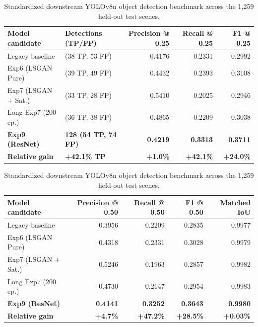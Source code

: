 \documentclass[10pt,a4paper,twoside]{article}
\begin{document}
\begin{table}[htbp]
    \caption{Standardized downstream YOLOv8n object detection benchmark across the 1,259 held-out test scenes.}
    \label{tab:yolo}
    \centering
    \scriptsize
    \setlength{\tabcolsep}{3pt}
    \begin{tabularx}{\textwidth}{@{}>{\raggedright\arraybackslash}X>{\centering\arraybackslash}p{2.1cm}rrr@{}}
        \toprule
        \textbf{Model candidate} & \textbf{Detections (TP/FP)} & \textbf{Precision @ 0.25} & \textbf{Recall @ 0.25} & \textbf{F1 @ 0.25} \\
        \midrule
        Legacy baseline & 91 (38 TP, 53 FP) & 0.4176 & 0.2331 & 0.2992 \\
        Exp6 (LSGAN Pure) & 88 (39 TP, 49 FP) & 0.4432 & 0.2393 & 0.3108 \\
        Exp7 (LSGAN + Sat.) & 61 (33 TP, 28 FP) & 0.5410 & 0.2025 & 0.2946 \\
        Long Exp7 (200 ep.) & 74 (36 TP, 38 FP) & 0.4865 & 0.2209 & 0.3038 \\
        \textbf{Exp9 (ResNet)} & \textbf{128 (54 TP, 74 FP)} & \textbf{0.4219} & \textbf{0.3313} & \textbf{0.3711} \\
        \midrule
        \textbf{Relative gain} & \textbf{+42.1\% TP} & \textbf{+1.0\%} & \textbf{+42.1\%} & \textbf{+24.0\%} \\
        \bottomrule
    \end{tabularx}

    \vspace{4pt}
    \begin{tabularx}{\textwidth}{@{}>{\raggedright\arraybackslash}Xrrrr@{}}
        \toprule
        \textbf{Model candidate} & \textbf{Precision @ 0.50} & \textbf{Recall @ 0.50} & \textbf{F1 @ 0.50} & \textbf{Matched IoU} \\
        \midrule
        Legacy baseline & 0.3956 & 0.2209 & 0.2835 & 0.9977 \\
        Exp6 (LSGAN Pure) & 0.4318 & 0.2331 & 0.3028 & 0.9979 \\
        Exp7 (LSGAN + Sat.) & 0.5246 & 0.1963 & 0.2857 & 0.9982 \\
        Long Exp7 (200 ep.) & 0.4730 & 0.2147 & 0.2954 & 0.9983 \\
        \textbf{Exp9 (ResNet)} & \textbf{0.4141} & \textbf{0.3252} & \textbf{0.3643} & \textbf{0.9980} \\
        \midrule
        \textbf{Relative gain} & \textbf{+4.7\%} & \textbf{+47.2\%} & \textbf{+28.5\%} & \textbf{+0.03\%} \\
        \bottomrule
    \end{tabularx}
\end{table}
\end{document}
